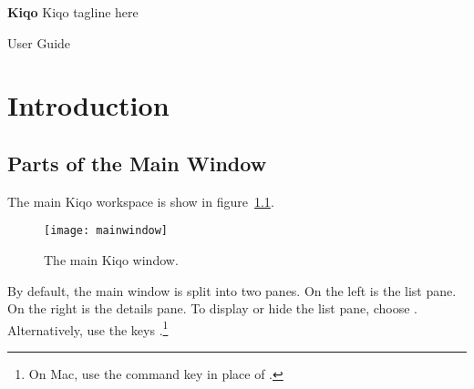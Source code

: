 \documentclass[11pt,fleqn]{book} %
\begin{document}

\begingroup
\thispagestyle{empty}
\centering
\vspace*{5cm}
\par\normalfont\fontsize{35}{35}\sffamily\selectfont
\textbf{Kiqo}
{\LARGE Kiqo tagline here}\par %
\vspace*{1cm}
{\Huge User Guide}\par %
\endgroup


\tableofcontents %


\chapter{Introduction}

\section{Parts of the Main Window}
The main Kiqo workspace is show in figure~\ref{fig:mainwindow}.

\begin{figure}[h]
  \centering
  \texttt{[image: mainwindow]}
  \caption{The main Kiqo window.\label{fig:mainwindow}}
\end{figure}

\pagebreak
By default, the main window is split into two panes.
On the left is the list pane.
On the right is the details pane.
To display or hide the list pane, choose .
Alternatively, use the keys .\footnote{On Mac,
use the command key \keys{\cmd} in place of \keys{\ctrl}.}\\
\end{document}
